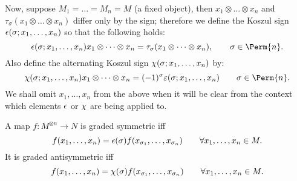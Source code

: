 Now, suppose $M_1 = \dots = M_n = M$ (a fixed object), then $x_1\otimes
\dots \otimes x_n$ and $\tau_\sigma(x_1\otimes \dots \otimes x_n)$ differ only by the sign;
therefore we define the Koszul sign $\epsilon(\sigma; x_1, \dots, x_n)$ so that
the following holds:
\begin{equation}
  \label{eq:ksz}
  \ksz(\sigma; x_1, \dots, x_n) x_1 \otimes \dots \otimes x_n =
  \tau_\sigma (x_1 \otimes \dots \otimes x_n), \qquad \sigma\in\Perm{n}.
\end{equation}
Also define the alternating Koszul sign $\chi(\sigma; x_1, \ldots, x_n)$ by:
\begin{equation}
  \label{eq:aksz}
  \aksz(\sigma; x_1, \dots, x_n) x_1 \otimes \dots \otimes x_n =
  (-1)^\sigma \varepsilon(\sigma; x_1, \ldots, x_n)
  \qquad \sigma\in\Perm{n}.
\end{equation}
We shall omit $x_1, \dots, x_n$ from the above when it will be clear
from the context which elements $\epsilon$ or $\chi$ are being applied
to.

\begin{definition}\label{dfn:graded-sym-map}
  A map $f: M^{\otimes n} \to N$ is graded symmetric iff
  \begin{equation*}
    f(x_1, \dots, x_n) = \epsilon(\sigma) f(x_{\sigma_1}, \dots,
    x_{\sigma_n}) \qquad \forall x_1, \dots, x_n \in M.
  \end{equation*}
  It is graded antisymmetric iff
  \begin{equation*}
    f(x_1, \dots, x_n) = \chi(\sigma) f(x_{\sigma_1}, \dots,
    x_{\sigma_n}) \qquad \forall x_1, \dots, x_n \in M.
  \end{equation*}
\end{definition}

